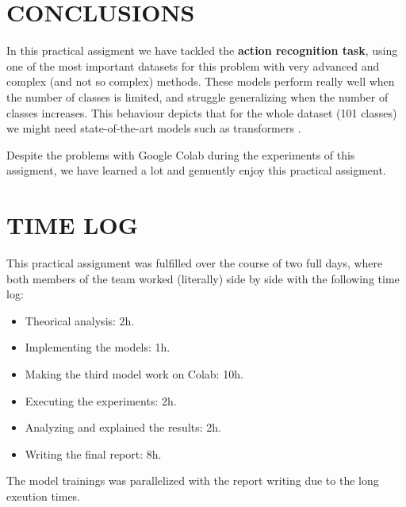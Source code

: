 \documentclass[letterpaper, 10 pt, conference]{ieeeconf}
\begin{document}
\section{CONCLUSIONS}
\label{section:conclusions}

In this practical assigment we have tackled the \textbf{action recognition task}, using one of the most important datasets for this problem with very advanced and complex (and not so complex) methods. These models perform really well when the number of classes is limited, and struggle generalizing when the number of classes increases. This behaviour depicts that for the whole dataset (101 classes) we might need state-of-the-art models such as transformers \cite{TRANSFORMERS}.

Despite the problems with Google Colab during the experiments of this assigment, we have learned a lot and genuently enjoy this practical assigment.

\section{TIME LOG}
\label{section:timelog}
This practical assignment was fulfilled over the course of two full days, where both members of the team worked (literally) side by side with the following time log:

\begin{itemize}
    \item Theorical analysis: 2h.
    \item Implementing the models: 1h.
    \item Making the third model work on Colab: 10h.
    \item Executing the experiments: 2h.
    \item Analyzing and explained the results: 2h.
    \item Writing the final report: 8h.
\end{itemize}

The model trainings was parallelized with the report writing due to the long exeution times.

\printbibliography
\end{document}
